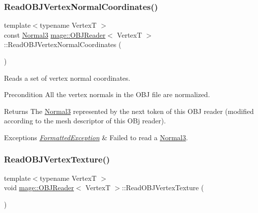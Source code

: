 \subsubsection{\texorpdfstring{Read\+O\+B\+J\+Vertex\+Normal\+Coordinates()}{ReadOBJVertexNormalCoordinates()}}
{\footnotesize\ttfamily template$<$typename VertexT $>$ \\
const \hyperlink{structmage_1_1_normal3}{Normal3} \hyperlink{classmage_1_1_o_b_j_reader}{mage\+::\+O\+B\+J\+Reader}$<$ VertexT $>$\+::Read\+O\+B\+J\+Vertex\+Normal\+Coordinates (\begin{DoxyParamCaption}{ }\end{DoxyParamCaption})\hspace{0.3cm}{\ttfamily [private]}}

Reads a set of vertex normal coordinates.

\begin{DoxyPrecond}{Precondition}
All the vertex normals in the O\+BJ file are normalized. 
\end{DoxyPrecond}
\begin{DoxyReturn}{Returns}
The {\ttfamily \hyperlink{structmage_1_1_normal3}{Normal3}} represented by the next token of this O\+BJ reader (modified according to the mesh descriptor of this O\+Bj reader). 
\end{DoxyReturn}

\begin{DoxyExceptions}{Exceptions}
{\em \hyperlink{classmage_1_1_formatted_exception}{Formatted\+Exception}} & Failed to read a {\ttfamily \hyperlink{structmage_1_1_normal3}{Normal3}}. \\
\hline
\end{DoxyExceptions}
\hypertarget{classmage_1_1_o_b_j_reader_ae0dfedd81f23e6e15725e9ef02dd3034}{}\label{classmage_1_1_o_b_j_reader_ae0dfedd81f23e6e15725e9ef02dd3034} 
\subsubsection{\texorpdfstring{Read\+O\+B\+J\+Vertex\+Texture()}{ReadOBJVertexTexture()}}
{\footnotesize\ttfamily template$<$typename VertexT $>$ \\
void \hyperlink{classmage_1_1_o_b_j_reader}{mage\+::\+O\+B\+J\+Reader}$<$ VertexT $>$\+::Read\+O\+B\+J\+Vertex\+Texture (\begin{DoxyParamCaption}{ }\end{DoxyParamCaption})\hspace{0.3cm}{\ttfamily [private]}}

